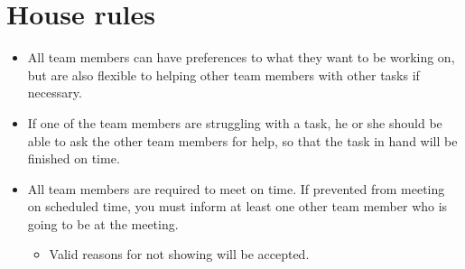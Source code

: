\documentclass{article}
\begin{document}
\newpage
\section*{House rules}
\begin{itemize}
\item All team members can have preferences to what they want to be working on, but are also flexible to helping other team members with other tasks if necessary.
\item If one of the team members are struggling with a task, he or she should be able to ask the other team members for help, so that the task in hand will be finished on time.
\item All team members are required to meet on time. If prevented from meeting on scheduled time, you must inform at least one other team member who is going to be at the meeting.
	\begin{itemize}
	\item Valid reasons for not showing will be accepted.
	\end{itemize}
\end{itemize}
\end{document}
